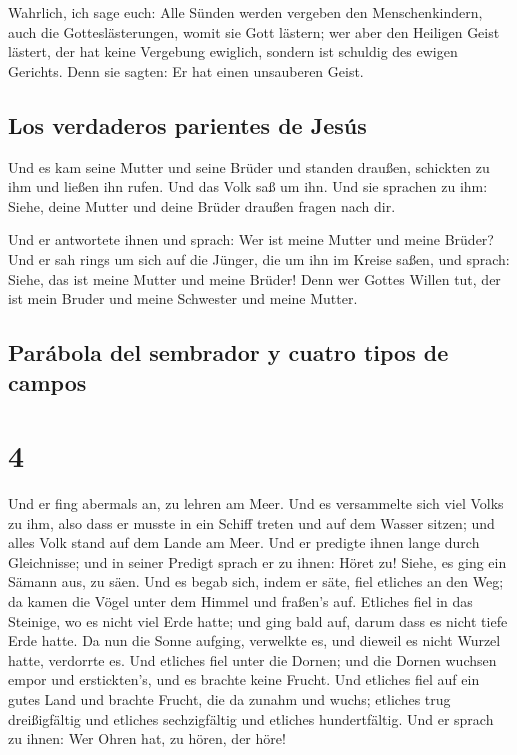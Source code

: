  Wahrlich, ich sage euch: Alle Sünden werden vergeben den
Menschenkindern, auch die Gotteslästerungen, womit sie Gott lästern;
 wer aber den Heiligen Geist lästert, der hat keine
Vergebung ewiglich, sondern ist schuldig des ewigen Gerichts.
 Denn sie sagten: Er hat einen unsauberen Geist.

\hypertarget{los-verdaderos-parientes-de-jesuxfas}{%
\subsection{Los verdaderos parientes de
Jesús}\label{los-verdaderos-parientes-de-jesuxfas}}

 Und es kam seine Mutter und seine Brüder und standen
draußen, schickten zu ihm und ließen ihn rufen.  Und das
Volk saß um ihn. Und sie sprachen zu ihm: Siehe, deine Mutter und deine
Brüder draußen fragen nach dir.

 Und er antwortete ihnen und sprach: Wer ist meine Mutter
und meine Brüder?  Und er sah rings um sich auf die
Jünger, die um ihn im Kreise saßen, und sprach: Siehe, das ist meine
Mutter und meine Brüder!  Denn wer Gottes Willen tut, der
ist mein Bruder und meine Schwester und meine Mutter.

\hypertarget{paruxe1bola-del-sembrador-y-cuatro-tipos-de-campos}{%
\subsection{Parábola del sembrador y cuatro tipos de
campos}\label{paruxe1bola-del-sembrador-y-cuatro-tipos-de-campos}}

\hypertarget{section-3}{%
\section{4}\label{section-3}}

 Und er fing abermals an, zu lehren am Meer. Und es
versammelte sich viel Volks zu ihm, also dass er musste in ein Schiff
treten und auf dem Wasser sitzen; und alles Volk stand auf dem Lande am
Meer.  Und er predigte ihnen lange durch Gleichnisse; und
in seiner Predigt sprach er zu ihnen:  Höret zu! Siehe, es
ging ein Sämann aus, zu säen.  Und es begab sich, indem er
säte, fiel etliches an den Weg; da kamen die Vögel unter dem Himmel und
fraßen's auf.  Etliches fiel in das Steinige, wo es nicht
viel Erde hatte; und ging bald auf, darum dass es nicht tiefe Erde
hatte.  Da nun die Sonne aufging, verwelkte es, und
dieweil es nicht Wurzel hatte, verdorrte es.  Und etliches
fiel unter die Dornen; und die Dornen wuchsen empor und erstickten's,
und es brachte keine Frucht.  Und etliches fiel auf ein
gutes Land und brachte Frucht, die da zunahm und wuchs; etliches trug
dreißigfältig und etliches sechzigfältig und etliches hundertfältig.
 Und er sprach zu ihnen: Wer Ohren hat, zu hören, der
höre!

